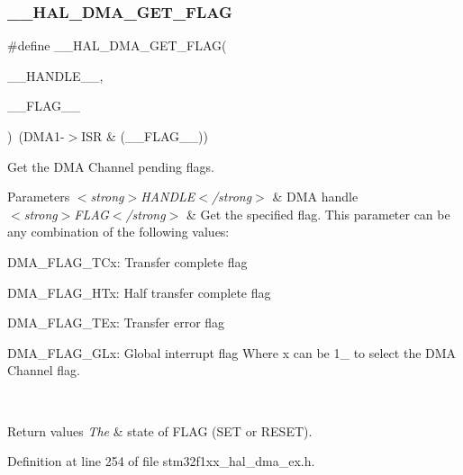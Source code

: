 \subsubsection{\texorpdfstring{\+\_\+\+\_\+\+H\+A\+L\+\_\+\+D\+M\+A\+\_\+\+G\+E\+T\+\_\+\+F\+L\+AG}{\_\_HAL\_DMA\_GET\_FLAG}}
{\footnotesize\ttfamily \#define \+\_\+\+\_\+\+H\+A\+L\+\_\+\+D\+M\+A\+\_\+\+G\+E\+T\+\_\+\+F\+L\+AG(\begin{DoxyParamCaption}\item[{}]{\+\_\+\+\_\+\+H\+A\+N\+D\+L\+E\+\_\+\+\_\+,  }\item[{}]{\+\_\+\+\_\+\+F\+L\+A\+G\+\_\+\+\_\+ }\end{DoxyParamCaption})~(D\+M\+A1-\/$>$I\+SR \& (\+\_\+\+\_\+\+F\+L\+A\+G\+\_\+\+\_\+))}



Get the D\+MA Channel pending flags. 


\begin{DoxyParams}{Parameters}
{\em $<$strong$>$\+H\+A\+N\+D\+L\+E$<$/strong$>$} & D\+MA handle \\
\hline
{\em $<$strong$>$\+F\+L\+A\+G$<$/strong$>$} & Get the specified flag. This parameter can be any combination of the following values\+: \begin{DoxyItemize}
\item D\+M\+A\+\_\+\+F\+L\+A\+G\+\_\+\+T\+Cx\+: Transfer complete flag \item D\+M\+A\+\_\+\+F\+L\+A\+G\+\_\+\+H\+Tx\+: Half transfer complete flag \item D\+M\+A\+\_\+\+F\+L\+A\+G\+\_\+\+T\+Ex\+: Transfer error flag \item D\+M\+A\+\_\+\+F\+L\+A\+G\+\_\+\+G\+Lx\+: Global interrupt flag Where x can be 1\+\_ to select the D\+MA Channel flag. \end{DoxyItemize}
\\
\hline
\end{DoxyParams}

\begin{DoxyRetVals}{Return values}
{\em The} & state of F\+L\+AG (S\+ET or R\+E\+S\+ET). \\
\hline
\end{DoxyRetVals}


Definition at line 254 of file stm32f1xx\+\_\+hal\+\_\+dma\+\_\+ex.\+h.

\mbox{\label{group___d_m_a___low__density___medium__density___product__devices_ga718c628ea8c112c5b09bc61c52b86e75}} 
